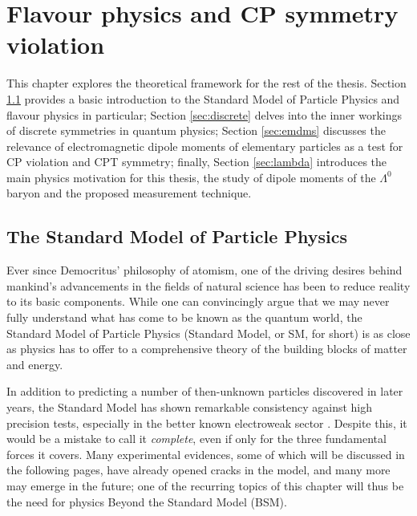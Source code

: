 \chapter{Flavour physics and CP symmetry violation}
This chapter explores the theoretical framework for the rest of the thesis.
Section \ref{sec:sm} provides a basic introduction to the Standard Model of Particle Physics and flavour physics in particular;
Section \ref{sec:discrete} delves into the inner workings of discrete symmetries in quantum physics;
Section \ref{sec:emdms} discusses the relevance of electromagnetic dipole moments of elementary particles as a test for CP violation and CPT symmetry;
finally, Section \ref{sec:lambda} introduces the main physics motivation for this thesis, the study of dipole moments of the $\Lambda^0$ baryon and the proposed measurement technique.

\section{The Standard Model of Particle Physics}
\label{sec:sm}
Ever since Democritus' philosophy of atomism, one of the driving desires behind mankind's advancements in the fields of natural science has been to reduce reality to its basic components.
While one can convincingly argue that we may never fully understand what has come to be known as the quantum world, the Standard Model of Particle Physics (Standard Model, or SM, for short) \cite{aitchinson_hey} is as close as physics has to offer to a comprehensive theory of the building blocks of matter and energy.

In addition to predicting a number of then-unknown particles discovered in later years, the Standard Model has shown remarkable consistency against high precision tests, especially in the better known electroweak sector \cite{Erler_2019}.
Despite this, it would be a mistake to call it \textit{complete}, even if only for the three fundamental forces it covers.
Many experimental evidences, some of which will be discussed in the following pages, have already opened cracks in the model, and many more may emerge in the future;
one of the recurring topics of this chapter will thus be the need for physics Beyond the Standard Model (BSM).

